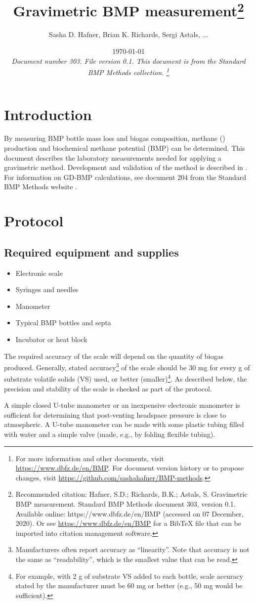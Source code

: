 \documentclass[]{article}
\title {Gravimetric BMP measurement\footnote{
  Recommended citation: 
Hafner, S.D.; Richards, B.K.; Astals, S. Gravimetric BMP measurement. Standard BMP Methods document 303, version 0.1. Available online: https://www.dbfz.de/en/BMP (accessed on 07 December, 2020).
\newline
  Or see \url{https://www.dbfz.de/en/BMP} for a BibTeX file that can be imported into citation management software.
}
}
\author{Sasha D. Hafner, Brian K. Richards, Sergi Astals, ...}
\date{\today \\
\bigskip
\textit{
  Document number 303.
  File version 0.1. 
  This document is from the Standard BMP Methods collection.
    \footnote{For more information and other documents, visit \url{https://www.dbfz.de/en/BMP}. 
    For document version history or to propose changes, visit \url{https://github.com/sashahafner/BMP-methods}.}
}
}
\begin{document}
\maketitle

\section{Introduction}
By measuring BMP bottle mass loss and biogas composition, methane () production and biochemical methane potential (BMP) can be determined.
This document describes the laboratory measurements needed for applying a gravimetric method.
Development and validation of the method is described in \citet{justesenDevelopmentValidationLowcost2019}.
For information on GD-BMP calculations, see document 204 from the Standard BMP Methods website \citep{BMPdoc204gasdens}. 

\section{Protocol}

\subsection{Required equipment and supplies}

\begin{itemize}
    \item Electronic scale
    \item Syringes and needles
    \item Manometer
    \item Typical BMP bottles and septa
    \item Incubator or heat block
\end{itemize}

The required accuracy of the scale will depend on the quantity of biogas produced. 
Generally, stated accuracy\footnote{
  Manufacturers often report accuracy as ``linearity''. 
  Note that accuracy is not the same as ``readability'', which is the smallest value that can be read. 
} of the scale should be 30 mg for every g of substrate volatile solids (VS) used, or better (smaller)\footnote{
  For example, with 2 g of substrate VS added to each bottle, scale accuracy stated by the manufacturer must be 60 mg or better (e.g., 50 mg would be sufficient).
}.
As described below, the precision and stability of the scale is checked as part of the protocol.

A simple closed U-tube manometer or an inexpensive electronic manometer is sufficient for determining that post-venting headspace pressure is close to atmospheric.
A U-tube manometer can be made with some plastic tubing filled with water and a simple valve (made, e.g., by folding flexible tubing).
\end{document}
